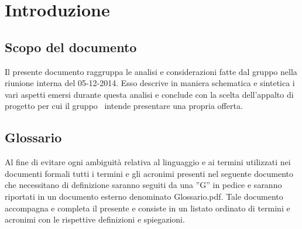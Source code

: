 \section{Introduzione}
\subsection{Scopo del documento}
Il presente documento raggruppa le analisi e considerazioni fatte dal gruppo nella
riunione interna del 05-12-2014. Esso descrive in maniera schematica e sintetica i
vari aspetti emersi durante questa analisi e conclude con la scelta dell'appalto di
progetto per cui il gruppo \gruppo\ intende presentare una propria offerta. 

\subsection{Glossario}

Al fine di evitare ogni ambiguità relativa al linguaggio e ai termini utilizzati nei documenti formali tutti i termini e gli acronimi presenti nel seguente documento che necessitano di definizione saranno seguiti da una ”G” in pedice e saranno riportati in un documento esterno denominato Glossario.pdf. Tale documento accompagna e completa il presente e consiste in un listato ordinato di termini e acronimi con le rispettive definizioni e spiegazioni.
